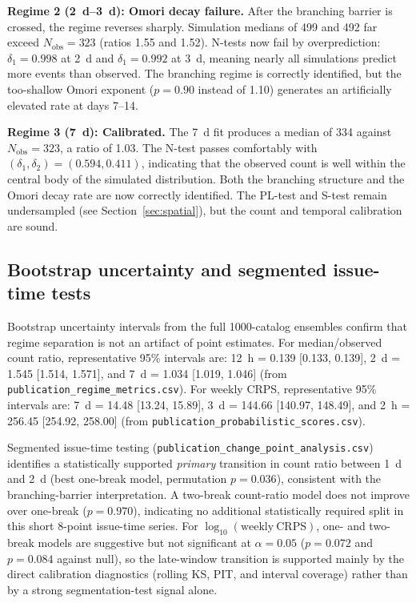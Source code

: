 \documentclass[12pt,letterpaper]{article}
\begin{document}
\vspace{6pt}
\noindent\textbf{Regime 2 (2~d--3~d): Omori decay failure.}
After the branching barrier is crossed, the regime reverses sharply.
Simulation medians of 499 and 492 far exceed $N_{\mathrm{obs}}=323$
(ratios 1.55 and 1.52). N-tests now fail by overprediction:
$\delta_1=0.998$ at 2~d and $\delta_1=0.992$ at 3~d, meaning nearly all
simulations predict more events than observed. The branching regime is
correctly identified, but the too-shallow Omori exponent ($p=0.90$ instead of
1.10) generates an artificially elevated rate at days 7--14.

\vspace{6pt}
\noindent\textbf{Regime 3 (7~d): Calibrated.}
The 7~d fit produces a median of 334 against $N_{\mathrm{obs}}=323$, a ratio
of 1.03. The N-test passes comfortably with $(\delta_1,\delta_2)=(0.594,0.411)$,
indicating that the observed count is well within the central body of the
simulated distribution. Both the branching structure and the Omori decay rate
are now correctly identified. The PL-test and S-test remain undersampled (see
Section~\ref{sec:spatial}), but the count and temporal calibration are sound.

\subsection{Bootstrap uncertainty and segmented issue-time tests}
\label{sec:segmented_tests}

Bootstrap uncertainty intervals from the full 1000-catalog ensembles confirm
that regime separation is not an artifact of point estimates. For median/observed
count ratio, representative 95\% intervals are:
12~h = 0.139 [0.133, 0.139], 2~d = 1.545 [1.514, 1.571], and
7~d = 1.034 [1.019, 1.046] (from
\texttt{publication\_regime\_metrics.csv}). For weekly CRPS, representative
95\% intervals are:
7~d = 14.48 [13.24, 15.89], 3~d = 144.66 [140.97, 148.49], and
2~h = 256.45 [254.92, 258.00]
(from \texttt{publication\_probabilistic\_scores.csv}).

Segmented issue-time testing (\texttt{publication\_change\_point\_analysis.csv})
identifies a statistically supported \emph{primary} transition in count ratio
between 1~d and 2~d (best one-break model, permutation $p=0.036$), consistent
with the branching-barrier interpretation. A two-break count-ratio model does
not improve over one-break ($p=0.970$), indicating no additional statistically
required split in this short 8-point issue-time series. For
$\log_{10}(\mathrm{weekly\ CRPS})$, one- and two-break models are suggestive
but not significant at $\alpha=0.05$ ($p=0.072$ and $p=0.084$ against null),
so the late-window transition is supported mainly by the direct calibration
diagnostics (rolling KS, PIT, and interval coverage) rather than by a strong
segmentation-test signal alone.
\end{document}
